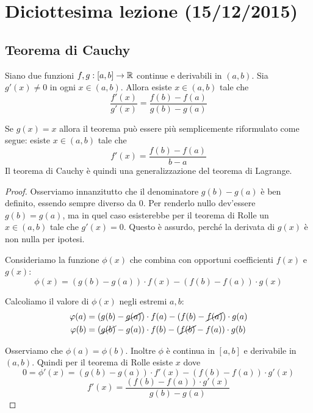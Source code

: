 \chapter{Diciottesima lezione (15/12/2015)}

\section{Teorema di Cauchy}

\begin{theorem}
Siano due funzioni $f, g: [a, b] \to \R$ continue e derivabili in $(a,b)$. Sia $g'(x) \neq 0$ in ogni $x \in (a,b)$. Allora esiste $x \in (a,b)$ tale che
\begin{equation*}
\frac{f'(x)}{g'(x)} = \frac{f(b)-f(a)}{g(b)-g(a)}
\end{equation*}
\end{theorem}

\begin{example}
Se $g(x) = x$ allora il teorema può essere più semplicemente riformulato come segue: esiste $x \in (a,b)$ tale che
\begin{equation*}
f'(x) = \frac{f(b)-f(a)}{b-a}
\end{equation*}
Il teorema di Cauchy è quindi una generalizzazione del teorema di Lagrange.
\end{example}

\begin{proof}
Osserviamo innanzitutto che il denominatore $g(b)-g(a)$ è ben definito, essendo sempre diverso da 0. Per renderlo nullo dev'essere $g(b) = g(a)$, ma in quel caso esisterebbe per il teorema di Rolle un $x \in (a,b)$ tale che $g'(x) = 0$. Questo è assurdo, perché la derivata di $g(x)$ è non nulla per ipotesi.

Consideriamo la funzione $\phi (x)$ che combina con opportuni coefficienti $f(x)$ e $g(x)$:
\begin{equation*}
\phi (x) = (g(b)-g(a)) \cdot f(x) - (f(b)-f(a)) \cdot g(x)
\end{equation*}

Calcoliamo il valore di $\phi(x)$ negli estremi $a, b$:
\begin{align*}
\phi(a) &= (g(b)-\cancel{g(a)}) \cdot f(a) - (f(b)-\cancel{f(a)}) \cdot g(a) \\
\phi(b) &= (\cancel{g(b)}-g(a)) \cdot f(b) - (\cancel{f(b)}-f(a)) \cdot g(b)
\end{align*}

Osserviamo che $\phi(a) = \phi(b)$. Inoltre $\phi$ è continua in $[a,b]$ e derivabile in $(a,b)$. Quindi per il teorema di Rolle esiste $x$ dove
\begin{equation*}
0 = \phi'(x) = (g(b)-g(a)) \cdot f'(x) - (f(b)-f(a)) \cdot g'(x)
\end{equation*}
\begin{equation*}
f'(x) = \frac{(f(b)-f(a)) \cdot g'(x)}{g(b)-g(a)}
\end{equation*}
\end{proof}

